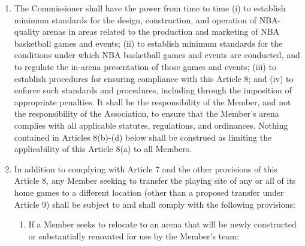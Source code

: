 \documentclass[]{book}
\providecommand{\tightlist}{%
  \setlength{\itemsep}{0pt}\setlength{\parskip}{0pt}}
\begin{document}
\begin{enumerate}
\def\labelenumi{(\alph{enumi})}
\tightlist
\item
  The Commissioner shall have the power from time to time (i) to establish minimum standards for the design, construction, and operation of NBA-quality arenas in areas related to the production and marketing of NBA basketball games and events; (ii) to establish minimum standards for the conditions under which NBA basketball games and events are conducted, and to regulate the in-arena presentation of those games and events; (iii) to establish procedures for ensuring compliance with this Article 8; and (iv) to enforce such standards and procedures, including through the imposition of appropriate penalties. It shall be the responsibility of the Member, and not the responsibility of the Association, to ensure that the Member's arena complies with all applicable statutes, regulations, and ordinances. Nothing contained in Articles 8(b)-(d) below shall be construed as limiting the applicability of this Article 8(a) to all Members.
\item
  In addition to complying with Article 7 and the other provisions of this Article 8, any Member seeking to transfer the playing site of any or all of its home games to a different location (other than a proposed transfer under Article 9) shall be subject to and shall comply with the following provisions:

  \begin{enumerate}
  \def\labelenumii{(\roman{enumii})}
  \tightlist
  \item
    If a Member seeks to relocate to an arena that will be newly constructed or substantially renovated for use by the Member's team:


\end{enumerate}
\end{enumerate}
\end{document}
